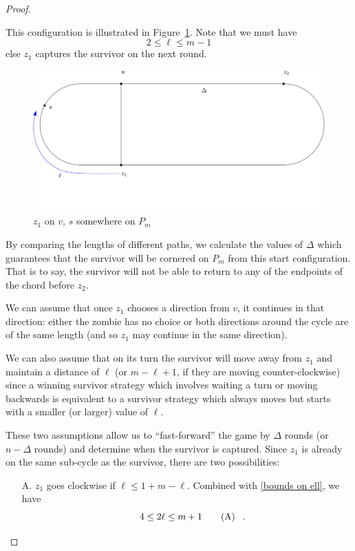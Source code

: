 \begin{proof}
\begin{proofpart}
  This configuration is illustrated in Figure~\ref{fig:onthechord}.
  Note that we must have
  \[2 \leq \ell \leq m-1 \tag{1} \label{bounds on ell}\]
  else $z_1$ captures the survivor on the next round.

  \begin{figure}
    \centering
    \includegraphics{q_m_n/diagram1}
    \caption{$z_1$ on $v$, $s$ somewhere on $P_m$ \label{fig:onthechord}}
  \end{figure}

  By comparing the lengths of different paths, we calculate the values of $\Delta$
  which guarantees that the survivor will be cornered on $P_m$ from this start configuration. That is to say, the survivor will not be able to return to any of the endpoints of the chord before $z_2$.

  We can assume that once $z_1$ chooses a direction from $v$, it continues in that direction: either the zombie has no choice or both directions around the cycle are of the same length (and so
  $z_1$ may continue in the same direction).

  We can also assume that on its turn the survivor will move away from
  $z_1$ and maintain a distance of $\ell$ (or $m-\ell +1$, if they are moving counter-clockwise)
  since a winning survivor strategy which involves waiting a turn
  or moving backwards is equivalent to a survivor strategy
  which always moves but starts with a smaller (or larger) value of $\ell$.

  These two assumptions allow us to ``fast-forward'' the game by $\Delta$ rounds (or $n-\Delta$ rounds) and determine when the survivor is captured. Since $z_1$ is already on the same sub-cycle as the survivor, there are two possibilities:

  \begin{itemize}
   \item[A.] $z_1$ goes clockwise if $\ell \leq 1 + m - \ell$.
         Combined with \ref{bounds on ell}, we have
         \begin{equation}
           4 \leq 2 \ell \leq m + 1 \tag{A} \label{assumption a} \mperiod
         \end{equation}


\end{itemize}
\end{proofpart}
\end{proof}
